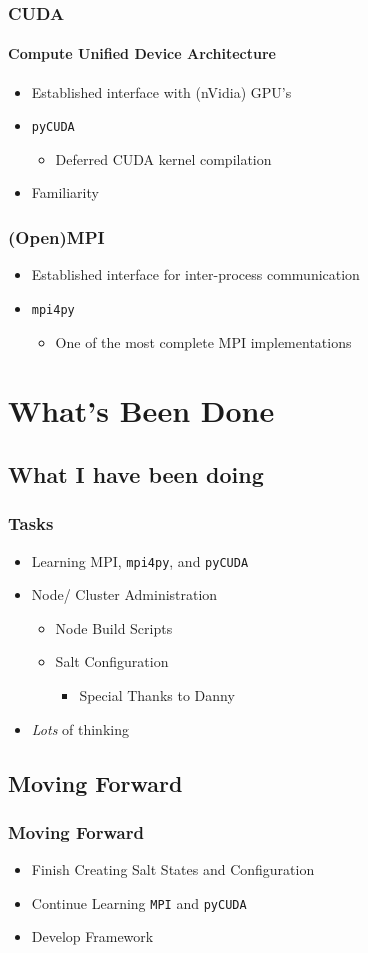 \documentclass{beamer}
\begin{document}
\begin{frame}
\frametitle{CUDA}
\framesubtitle{Compute Unified Device Architecture}
\begin{itemize}
\item{Established interface with (nVidia) GPU's}
\item{\texttt{pyCUDA}}
\begin{itemize}
\item{Deferred CUDA kernel compilation}
\end{itemize}
\item{Familiarity}
\end{itemize}
\end{frame}
\begin{frame}
\frametitle{(Open)MPI}
\begin{itemize}
\item{Established interface for inter-process communication}
\item{\texttt{mpi4py}}
\begin{itemize}
\item{One of the most complete MPI implementations}
\end{itemize}
\end{itemize}
\end{frame}
\section{What's Been Done}
\subsection{What I have been doing}
\begin{frame}
\frametitle{Tasks}
\begin{itemize}
\item{Learning MPI, \texttt{mpi4py}, and \texttt{pyCUDA}}
\item{Node/ Cluster Administration}
\begin{itemize}
\item{Node Build Scripts}
\item{Salt Configuration}
\begin{itemize}
\item{Special Thanks to Danny}
\end{itemize}
\end{itemize}
\item{\emph{Lots} of thinking}
\end{itemize}
\end{frame}
\subsection{Moving Forward}
\begin{frame}
\frametitle{Moving Forward}
\begin{itemize}
\item{Finish Creating Salt States and Configuration}
\item{Continue Learning \texttt{MPI} and \texttt{pyCUDA}}
\item{Develop Framework}
\end{itemize}
\end{frame}
\end{document}
